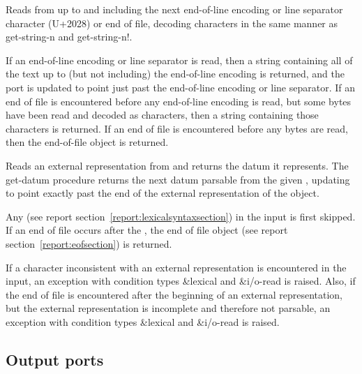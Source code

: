 \begin{entry}{%
}
   
Reads from  up to and including the next
end-of-line encoding or line separator character (U+2028) or 
end of file, decoding characters in the same manner as {\cf
  get-string-n} and {\cf get-string-n!}.
   
If an end-of-line encoding or line separator is read, then a string
containing all of the text up to (but not including) the end-of-line
encoding is returned, and the port is updated to point just past the
end-of-line encoding or line separator. If an end of file is
encountered before any end-of-line encoding is read, but some bytes
have been read and decoded as characters, then a string containing
those characters is returned. If an end of file is encountered before
any bytes are read, then the end-of-file object is
returned.
\end{entry}

\begin{entry}{%
}
 
Reads an external representation from  and returns the
datum it represents.  The {\cf get-datum} procedure returns the next
datum parsable from the given , updating
 to point exactly past the end of the external
representation of the object.

Any  (see report section~\ref{report:lexicalsyntaxsection}) in
the input is first skipped.  If an end of file occurs after the
, the end of file object (see
report section~\ref{report:eofsection}) is returned.

If a character inconsistent with an external representation is
encountered in the input, an exception with condition types
{\cf\&lexical} and {\cf\&i/o-read} is raised.  Also, if the end of file is encountered
after the beginning of an external representation, but the external
representation is incomplete and therefore not parsable, an exception
with condition types {\cf\&lexical} and {\cf\&i/o-read} is raised.
\end{entry}

\subsection{Output ports}

